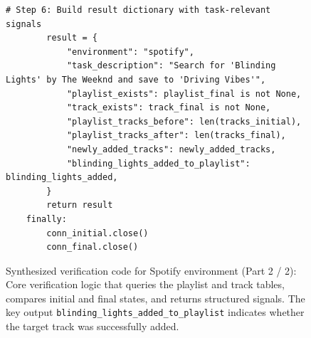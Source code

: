 \begin{figure}[t]
\begin{minipage}{0.97\textwidth}
\begin{lstlisting}[style=pythonstyle, firstnumber=50]
        # Step 6: Build result dictionary with task-relevant signals
        result = {
            "environment": "spotify",
            "task_description": "Search for 'Blinding Lights' by The Weeknd and save to 'Driving Vibes'",
            "playlist_exists": playlist_final is not None,
            "track_exists": track_final is not None,
            "playlist_tracks_before": len(tracks_initial),
            "playlist_tracks_after": len(tracks_final),
            "newly_added_tracks": newly_added_tracks,
            "blinding_lights_added_to_playlist": blinding_lights_added,
        }
        return result
    finally:
        conn_initial.close()
        conn_final.close()
\end{lstlisting}
\end{minipage}
\caption{Synthesized verification code for Spotify environment (Part 2 / 2): Core verification logic that queries the playlist and track tables, compares initial and final states, and returns structured signals. The key output \texttt{blinding\_lights\_added\_to\_playlist} indicates whether the target track was successfully added.}
\label{fig:verification-code-part2}
\end{figure}
